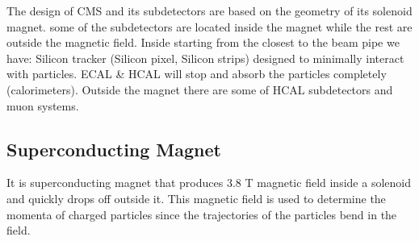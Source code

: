 The design of CMS and its subdetectors are based on the geometry of its solenoid magnet. some of the subdetectors are located inside the magnet while the rest are outside the magnetic field. Inside starting from the closest to the beam pipe we have: Silicon tracker (Silicon pixel, Silicon strips) designed to minimally interact with particles. ECAL & HCAL will stop and absorb the particles completely (calorimeters).  Outside the magnet there are some of HCAL subdetectors and muon systems. 



\subsection{Superconducting Magnet}
It is superconducting magnet that produces 3.8 T magnetic field inside a solenoid and quickly drops off outside it. This magnetic field is used to determine the momenta of charged particles since the trajectories of the particles bend in the field.
